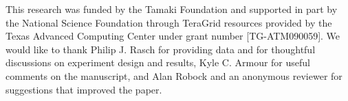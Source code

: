 \documentclass[12pt]{article}
\begin{document}
\begin{acknowledgment} 
This research was funded by the Tamaki Foundation and supported in part by the National Science Foundation through TeraGrid resources provided by the Texas Advanced Computing Center under grant number [TG-ATM090059]. We would like to thank Philip J. Rasch for providing data and for thoughtful discussions on experiment design and results, Kyle C. Armour for useful comments on the manuscript, and Alan Robock and an anonymous reviewer for suggestions that improved the paper.
\end{acknowledgment}


{}
{\clearpage}













%
\end{document}
